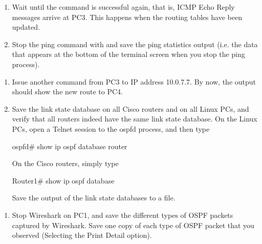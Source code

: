 \begin{enumerate}[resume]
	\item Wait until the  command is successful again, that is, ICMP Echo Reply messages arrive at PC3. This happens when the routing tables have been updated.
	\item Stop the ping command with  and save the ping statistics output (i.e. the data that appears at the bottom of the terminal screen when you stop the ping process).
\end{enumerate}

\begin{questions}
\end{questions}

\begin{enumerate}[resume]
	\item Issue another  command from PC3 to IP address 10.0.7.7. By now, the output should show the new route to PC4.
	\item Save the link state database on all Cisco routers and on all Linux PCs, and verify that all routers indeed have the same link state database. On the Linux PCs, open a Telnet session to the ospfd process, and then type
		\begin{cmdblock}
	ospfd# show ip ospf database router
		\end{cmdblock}
		On the Cisco routers, simply type
		\begin{cmdblock}
	Router1# show ip ospf database
		\end{cmdblock}
		Save the output of the link state databases to a file.
\end{enumerate}

\begin{questions}
\end{questions}

\begin{enumerate}[resume]
	\item Stop Wireshark on PC1, and save the different types of OSPF packets captured by Wireshark. Save one copy of each type of OSPF packet that you observed (Selecting the Print Detail option).
\end{enumerate}

